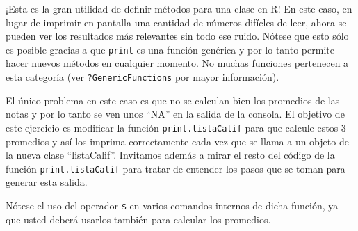 \documentclass[]{article}
\newenvironment{Shaded}{}{}
\newcommand{\KeywordTok}[1]{\textcolor[rgb]{0.00,0.44,0.13}{\textbf{{#1}}}}
\newcommand{\DecValTok}[1]{\textcolor[rgb]{0.25,0.63,0.44}{{#1}}}
\newcommand{\FloatTok}[1]{\textcolor[rgb]{0.25,0.63,0.44}{{#1}}}
\newcommand{\StringTok}[1]{\textcolor[rgb]{0.25,0.44,0.63}{{#1}}}
\newcommand{\OtherTok}[1]{\textcolor[rgb]{0.00,0.44,0.13}{{#1}}}
\newcommand{\ErrorTok}[1]{\textcolor[rgb]{1.00,0.00,0.00}{\textbf{{#1}}}}
\newcommand{\NormalTok}[1]{{#1}}
\begin{document}
\begin{Shaded}
\end{Shaded}
¡Esta es la gran utilidad de definir métodos para una clase en R! En
este caso, en lugar de imprimir en pantalla una cantidad de números
difícles de leer, ahora se pueden ver los resultados más relevantes sin
todo ese ruido. Nótese que esto sólo es posible gracias a que
\texttt{print} es una función genérica y por lo tanto permite hacer
nuevos métodos en cualquier momento. No muchas funciones pertenecen a
esta categoría (ver \texttt{?GenericFunctions} por mayor información).

El único problema en este caso es que no se calculan bien los promedios
de las notas y por lo tanto se ven unos ``NA'' en la salida de la
consola. El objetivo de este ejercicio es modificar la función
\texttt{print.listaCalif} para que calcule estos 3 promedios y así los
imprima correctamente cada vez que se llama a un objeto de la nueva
clase ``listaCalif''. Invitamos además a mirar el resto del código de la
función \texttt{print.listaCalif} para tratar de entender los pasos que
se toman para generar esta salida.

Nótese el uso del operador \texttt{\$} en varios comandos internos de
dicha función, ya que usted deberá usarlos también para calcular los
promedios.
\end{document}
